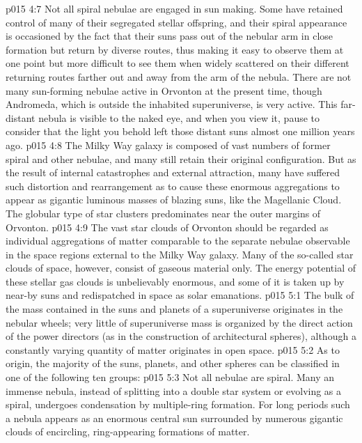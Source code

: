 \vs p015 4:7 Not all spiral nebulae are engaged in sun making. Some have retained control of many of their segregated stellar offspring, and their spiral appearance is occasioned by the fact that their suns pass out of the nebular arm in close formation but return by diverse routes, thus making it easy to observe them at one point but more difficult to see them when widely scattered on their different returning routes farther out and away from the arm of the nebula. There are not many sun\hyp{}forming nebulae active in Orvonton at the present time, though Andromeda, which is outside the inhabited superuniverse, is very active. This far\hyp{}distant nebula is visible to the naked eye, and when you view it, pause to consider that the light you behold left those distant suns almost one million years ago.
\vs p015 4:8 The Milky Way galaxy is composed of vast numbers of former spiral and other nebulae, and many still retain their original configuration. But as the result of internal catastrophes and external attraction, many have suffered such distortion and rearrangement as to cause these enormous aggregations to appear as gigantic luminous masses of blazing suns, like the Magellanic Cloud. The globular type of star clusters predominates near the outer margins of Orvonton.
\vs p015 4:9 The vast star clouds of Orvonton should be regarded as individual aggregations of matter comparable to the separate nebulae observable in the space regions external to the Milky Way galaxy. Many of the so\hyp{}called star clouds of space, however, consist of gaseous material only. The energy potential of these stellar gas clouds is unbelievably enormous, and some of it is taken up by near\hyp{}by suns and redispatched in space as solar emanations.
\vs p015 5:1 The bulk of the mass contained in the suns and planets of a superuniverse originates in the nebular wheels; very little of superuniverse mass is organized by the direct action of the power directors (as in the construction of architectural spheres), although a constantly varying quantity of matter originates in open space.
\vs p015 5:2 As to origin, the majority of the suns, planets, and other spheres can be classified in one of the following ten groups:
\vs p015 5:3 \pc {}\bibnobreakspace {} Not all nebulae are spiral. Many an immense nebula, instead of splitting into a double star system or evolving as a spiral, undergoes condensation by multiple\hyp{}ring formation. For long periods such a nebula appears as an enormous central sun surrounded by numerous gigantic clouds of encircling, ring\hyp{}appearing formations of matter.
